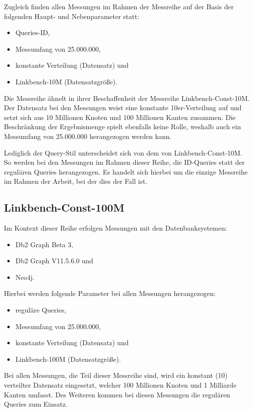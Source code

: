 Zugleich finden allen Messungen im Rahmen der Messreihe auf der Basis der folgenden Haupt- und Nebenparameter statt:
\begin{itemize}
    \item Queries-ID,
    \item Messumfang von 25.000.000,
    \item konstante Verteilung (Datensatz) und
    \item Linkbench-10M (Datensatzgröße).
\end{itemize}
Die Messreihe ähnelt in ihrer Beschaffenheit der Messreihe Linkbench-Const-10M. Der Datensatz bei den Messungen weist eine konstante 10er-Verteilung auf und setzt sich aus 10 Millionen Knoten und 100 Millionen Kanten zusammen. Die Beschränkung der Ergebnismenge spielt ebenfalls keine Rolle, weshalb auch ein Messumfang von 25.000.000 herangezogen werden kann. 

Lediglich der Query-Stil unterscheidet sich von dem von  Linkbench-Const-10M. So werden bei den Messungen im Rahmen dieser Reihe, die ID-Queries statt der regulären Queries herangezogen. Es handelt sich hierbei um die einzige Messreihe im Rahmen der Arbeit, bei der dies der Fall ist.

\subsection{Linkbench-Const-100M}
Im Kontext dieser Reihe erfolgen Messungen mit den Datenbanksystemen:
\begin{itemize}
    \item Db2 Graph Beta 3,
    \item Db2 Graph V11.5.6.0 und 
    \item Neo4j. 
\end{itemize}

Hierbei werden folgende Parameter bei allen Messungen herangezogen:
\begin{itemize}
    \item reguläre Queries,
    \item Messumfang von 25.000.000,
    \item konstante Verteilung (Datensatz) und
    \item Linkbench-100M (Datensatzgröße).
\end{itemize}
Bei allen Messungen, die Teil dieser Messreihe sind, wird ein konstant (10) verteilter Datensatz eingesetzt, welcher 100 Millionen Knoten und 1 Milliarde Kanten umfasst. Des Weiteren kommen bei diesen Messungen die regulären Queries zum Einsatz. 

